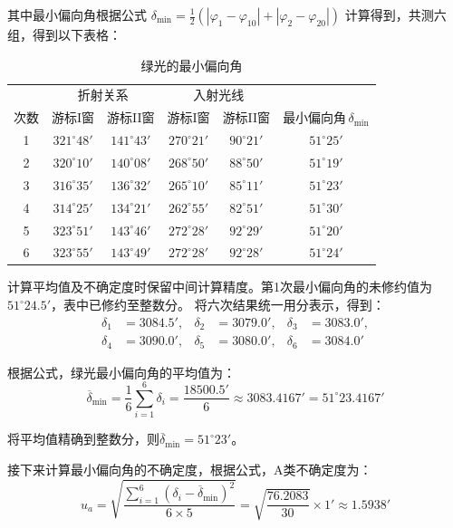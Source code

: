 \documentclass[10pt,a4paper]{ctexart} %
\begin{document}
    其中最小偏向角根据公式
    $\delta_{\min} = \frac{1}{2}\left(\left|\varphi_1 - \varphi_{10}\right| + \left|\varphi_2 - \varphi_{20}\right|\right)$
    计算得到，共测六组，得到以下表格：
    \begin{table}[H]
      \centering
      \caption{绿光的最小偏向角}
      \begin{tabular}{cccccc}
        \toprule
          & \multicolumn{2}{c}{折射关系} & \multicolumn{2}{c}{入射光线} & \\
        次数 & 游标I窗 & 游标II窗 & 游标I窗 & 游标II窗 & $\text{最小偏向角}\,\delta_{\min}$ \\
        \midrule
        1 & $321^\circ48'$ & $141^\circ43'$ & $270^\circ21'$ & $90^\circ21'$ & $51^\circ25'$ \\
        2 & $320^\circ10'$ & $140^\circ08'$ & $268^\circ50'$ & $88^\circ50'$ & $51^\circ19'$ \\
        3 & $316^\circ35'$ & $136^\circ32'$ & $265^\circ10'$ & $85^\circ11'$ & $51^\circ23'$ \\
        4 & $314^\circ25'$ & $134^\circ21'$ & $262^\circ55'$ & $82^\circ51'$ & $51^\circ30'$ \\
        5 & $323^\circ51'$ & $143^\circ46'$ & $272^\circ28'$ & $92^\circ29'$ & $51^\circ20'$ \\
        6 & $323^\circ55'$ & $143^\circ49'$ & $272^\circ28'$ & $92^\circ28'$ & $51^\circ24'$ \\
        \bottomrule
      \end{tabular}
    \end{table}

    计算平均值及不确定度时保留中间计算精度。第1次最小偏向角的未修约值为$51^\circ24.5'$，表中已修约至整数分。
    将六次结果统一用分表示，得到：
    \[
    \begin{aligned}
      \delta_1&=3084.5', & \delta_2&=3079.0', & \delta_3&=3083.0',\\
      \delta_4&=3090.0', & \delta_5&=3080.0', & \delta_6&=3084.0'
    \end{aligned}
    \]

    根据公式，绿光最小偏向角的平均值为：
    \[
    \overline{\delta}_{\min}
    =\frac{1}{6}\sum_{i=1}^{6}\delta_i
    =\frac{18500.5'}{6}
    \approx3083.4167'=51^\circ23.4167'
    \]
    
    将平均值精确到整数分，则$\overline{\delta}_{\min}=51^\circ23'$。

    接下来计算最小偏向角的不确定度，根据公式，A类不确定度为：
    \[
    u_a=\sqrt{\frac{\sum_{i=1}^{6}
    (\delta_i-\overline{\delta}_{\min})^2}{6\times5}}
    =\sqrt{\frac{76.2083}{30}}\times1'
    \approx1.5938'
    \]
\end{document}
